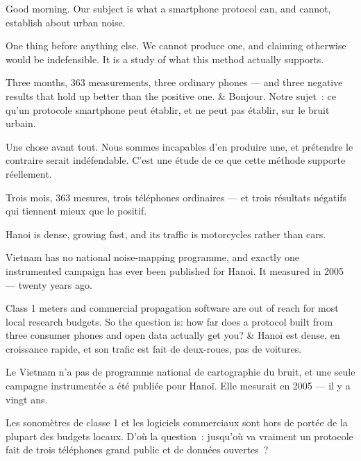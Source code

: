 \documentclass[10pt,a4paper]{article}
\begin{document}
\begin{say}
Good morning. Our subject is what a smartphone protocol can, and cannot,
establish about urban noise.

One thing before anything else.  We
cannot produce one, and claiming otherwise would be indefensible. It is a study
of what this method actually supports.

Three months, 363 measurements, three ordinary phones --- and three negative
results that hold up better than the positive one.
&
Bonjour. Notre sujet~: ce qu'un protocole smartphone peut établir, et ne peut pas
établir, sur le bruit urbain.

Une chose avant tout.  Nous
sommes incapables d'en produire une, et prétendre le contraire serait
indéfendable. C'est une étude de ce que cette méthode supporte réellement.

Trois mois, 363 mesures, trois téléphones ordinaires --- et trois résultats
négatifs qui tiennent mieux que le positif.
\end{say}

\begin{say}
Hanoi is dense, growing fast, and its traffic is motorcycles rather than cars.

Vietnam has no national noise-mapping programme, and exactly one instrumented
campaign has ever been published for Hanoi. It measured in 2005 --- twenty years
ago.

Class 1 meters and commercial propagation software are out of reach for most
local research budgets. So the question is: how far does a protocol built from
three consumer phones and open data actually get you?
&
Hanoï est dense, en croissance rapide, et son trafic est fait de deux-roues, pas
de voitures.

Le Vietnam n'a pas de programme national de cartographie du bruit, et une seule
campagne instrumentée a été publiée pour Hanoï. Elle mesurait en 2005 --- il y a
vingt ans.

Les sonomètres de classe 1 et les logiciels commerciaux sont hors de portée de la
plupart des budgets locaux. D'où la question~: jusqu'où va vraiment un protocole
fait de trois téléphones grand public et de données ouvertes~?
\end{say}
\end{document}
